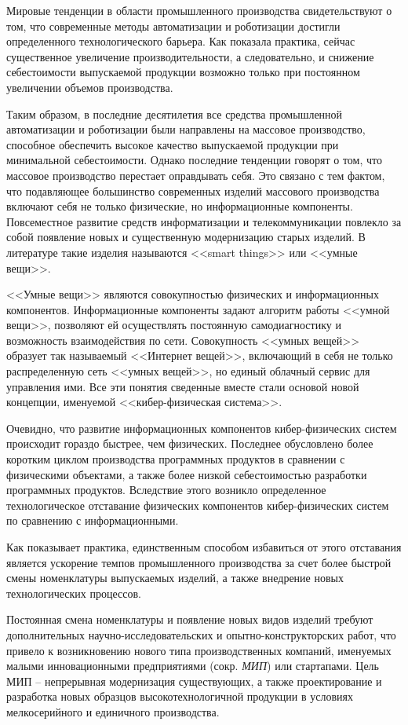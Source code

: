 
{\actuality} Мировые тенденции в области промышленного производства свидетельствуют о том, что современные методы автоматизации и роботизации достигли определенного технологического барьера. Как показала практика, сейчас существенное увеличение производительности, а следовательно, и снижение себестоимости выпускаемой продукции возможно только при постоянном увеличении объемов производства.

Таким образом, в последние десятилетия все средства промышленной автоматизации и роботизации были направлены на массовое производство, способное обеспечить высокое качество выпускаемой продукции при минимальной себестоимости. Однако последние тенденции говорят о том, что массовое производство перестает оправдывать себя. Это связано с тем фактом, что подавляющее большинство современных изделий массового производства включают себя не только физические, но информационные компоненты. Повсеместное развитие средств информатизации и телекоммуникации повлекло за собой появление новых и существенную модернизацию старых изделий. В литературе такие изделия называются <<smart things>> или <<умные вещи>>. 

<<Умные вещи>> являются совокупностью физических и информационных компонентов. Информационные компоненты задают алгоритм работы <<умной вещи>>, позволяют ей осуществлять постоянную самодиагностику и возможность взаимодействия по сети.  Совокупность <<умных вещей>> образует так называемый <<Интернет вещей>>, включающий в себя не только распределенную сеть <<умных вещей>>, но единый облачный сервис для управления ими. Все эти понятия сведенные вместе стали основой новой концепции, именуемой <<кибер-физическая система>>.

Очевидно, что развитие информационных компонентов кибер-физических систем происходит гораздо быстрее, чем физических. Последнее обусловлено более коротким циклом производства программных продуктов в сравнении с физическими объектами, а также более низкой себестоимостью разработки программных продуктов. Вследствие этого возникло определенное технологическое отставание физических компонентов кибер-физических систем по сравнению с информационными.

Как показывает практика, единственным способом избавиться от этого отставания является ускорение темпов промышленного производства за счет более быстрой смены номенклатуры выпускаемых изделий, а также внедрение новых технологических процессов.

Постоянная смена номенклатуры и появление новых видов изделий требуют дополнительных научно-исследовательских и опытно-конструкторских работ, что привело к возникновению нового типа производственных компаний, именуемых малыми инновационными предприятиями (сокр. \textit{МИП}) или стартапами. Цель МИП – непрерывная модернизация существующих, а также проектирование и разработка новых образцов высокотехнологичной продукции в условиях мелкосерийного и единичного производства.

